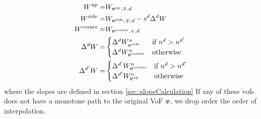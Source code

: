 \begin{enumerate}
\begin{align}
\begin{split}
W^{\text{up}} =& W_{{\boldsymbol{v}}^{\text{up}},\mp,d}              \\       
W^{\text{side}} =& W_{{\boldsymbol{v}}^{\text{side}},\mp,d} - s^d \Delta^d W \\      
W^{\text{corner}} =& W_{{\boldsymbol{v}}^{\text{corner}},\mp,d}      \\
\Delta^d W =& 
\begin{cases}
\Delta^d W^n_{{\boldsymbol{v}}^{\text{side}}} & \text{if } n^d > n^{d'} \\
\Delta^d W^n_{{\boldsymbol{v}}^{\text{corner}}} & \text{otherwise} \\
\end{cases} \\
\Delta^{d'} W =& 
\begin{cases}
\Delta^{d'} W^n_{{\boldsymbol{v}}^{\text{corner}}} & \text{if } n^d > n^{d'} \\
\Delta^{d'} W^n_{{\boldsymbol{v}}^{\text{up}}} & \text{otherwise} \\
\end{cases}
\end{split}
\end{align}
where the slopes are defined in section \ref{sec::slopeCalculation}
If any of these vofs does not have a monotone path to the original
VoF ${\boldsymbol{v}}$, we drop order the order of interpolation.


\end{enumerate}
